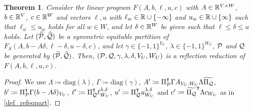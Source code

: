 \documentclass[pdflatex,sn-mathphys-num]{sn-jnl}%
\theoremstyle{thmstyleone}%
\newtheorem{theorem}[theorem]{Theorem}
\theoremstyle{thmstylethree}%
\theoremstyle{thmstyletwo}%
\newcommand{\diag}{\mathrm{diag}}
\begin{document}
\begin{theorem}
    \label{thm_refl_reduction}
     Consider the linear program $F(A,b,\ell, u, c)$ with $A\in \mathbb{R}^{V\times W}$, $b\in \mathbb{R}^{V}$, $c\in \mathbb{R}^{W}$ and vectors $\ell, u$ with $\ell_w \in \mathbb{R} \cup \{-\infty\}$ and $u_w\in \mathbb{R} \cup \{\infty\} $ such that $\ell_w \leq u_w$ holds for all $w\in W$, and let $\delta \in \mathbb{R}^W$ be given such that $\ell \leq \delta \leq u$ holds.
     Let $(\widehat{\mathcal{P}},\widehat{\mathcal{Q}})$ be a symmetric equitable partition of $F_S(A,b-A\delta, \ell - \delta, u - \delta,c)$, and let $\gamma \in \{-1,1\}^{V_U}$, $\lambda \in\{-1,1\}^{W_U}$, $\mathcal{P}$ and $\mathcal{Q}$ be generated by $(\widehat{\mathcal{P}},\widehat{\mathcal{Q}})$.
    Then, $(\mathcal{P},\mathcal{Q},\gamma,\lambda,\delta, V_U, W_U)$ is a reflection reduction of $F(A,b,\ell,u,c)$.
\end{theorem}
\begin{proof}
    We use $\Lambda \coloneqq \diag(\lambda)$, $\Gamma \coloneqq \diag(\gamma)$, $A'\coloneqq \transpose{\Pi_{\MP}}\Gamma A_{V_U,W_U}\Lambda \widetilde{\Pi_{\MQ}}$, $b'\coloneqq \transpose{\Pi_{\MP}}\Gamma(b- A\delta)_{V_U}$, $\ell' \coloneqq \transpose{\Pi_{\MQ}} \ell^{\lambda,\delta}_{W_U}$, $u'\coloneqq  \transpose{\Pi_{\MQ}} u^{\lambda,\delta}_{W_U}$ and $c'\coloneqq \transpose{\widetilde{\Pi_\MQ}} \Lambda c_{W_U}$ as in \cref{def_refeqpart}.
    

\end{proof}
\end{document}
